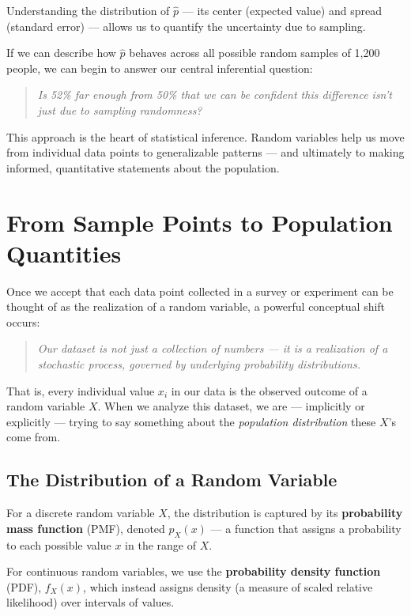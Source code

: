 \documentclass[12pt]{article}
\begin{document}
Understanding the distribution of $\hat{p}$ — its center (expected value) and spread (standard error) — allows us to quantify the uncertainty due to sampling.

If we can describe how $\hat{p}$ behaves across all possible random samples of 1,200 people, we can begin to answer our central inferential question:

\begin{quote}
\textit{Is 52\% far enough from 50\% that we can be confident this difference isn't just due to sampling randomness?}
\end{quote}

This approach is the heart of statistical inference. Random variables help us move from individual data points to generalizable patterns — and ultimately to making informed, quantitative statements about the population.

\section*{From Sample Points to Population Quantities}

Once we accept that each data point collected in a survey or experiment can be thought of as the realization of a random variable, a powerful conceptual shift occurs:

\begin{quote}
    \textit{Our dataset is not just a collection of numbers — it is a realization of a stochastic process, governed by underlying probability distributions.}
\end{quote}

That is, every individual value $x_i$ in our data is the observed outcome of a random variable $X$. When we analyze this dataset, we are — implicitly or explicitly — trying to say something about the \emph{population distribution} these $X$'s come from.

\subsection*{The Distribution of a Random Variable}

For a discrete random variable $X$, the distribution is captured by its \textbf{probability mass function} (PMF), denoted $p_X(x)$ — a function that assigns a probability to each possible value $x$ in the range of $X$.

For continuous random variables, we use the \textbf{probability density function} (PDF), $f_X(x)$, which instead assigns density (a measure of scaled relative likelihood) over intervals of values.
\end{document}
